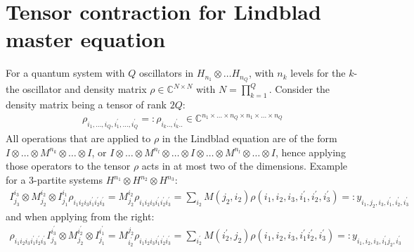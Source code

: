 \documentclass[letterpaper]{article}
\newcommand{\C}{\mathds{C}}
\begin{document}
\section{Tensor contraction for Lindblad master equation}
For a quantum system with $Q$ oscillators in $H_{n_1} \otimes \dots H_{n_Q}$, with $n_k$ levels for the $k$-the oscillator and density matrix $\rho \in \C^{N\times N}$ with $N=\prod_{k=1}^{Q}$. Consider the density matrix being a tensor of rank $2Q$: 
\begin{align}
    \rho_{i_1,\dots, i_Q, i_1^{\prime}, \dots, i_Q^{\prime}} =: \rho_{i_k .., i_k^\prime..}\in\C^{n_1\times \dots \times n_Q \times n_1 \times \dots \times n_Q}
\end{align}
All operations that are applied to $\rho$ in the Lindblad equation are of the form $I\otimes \dots \otimes M^{n_k} \otimes \dots \otimes I$, or $I\otimes \dots \otimes M^{n_l} \otimes \dots \otimes I \otimes \dots \otimes M^{n_l} \otimes \dots \otimes I$, hence applying those operators to the tensor $\rho$ acts in at most two of the dimensions. Example for a 3-partite systems $H^{n_1} \otimes H^{n_2} \otimes H^{n_3}$:
\begin{align}
    I^{i_3}_{j_3}\otimes M^{i_2}_{j_2} \otimes I^{i_1}_{j_1} \rho_{i_1i_2i_3i_1^{\prime}i_2^\prime i_3^\prime} = M^{i_2}_{j_2} \rho_{i_1i_2i_3i_1^{\prime}i_2^\prime i_3^\prime} = \sum_{i_2} M(j_2, i_2) \rho(i_1,i_2,i_3,i_1^{\prime},i_2^\prime, i_3^\prime)  =: y_{i_1,j_2,i_3,i_1^{\prime},i_2^\prime,i_3^\prime}
\end{align}
and when applying from the right:
\begin{align}
    \rho_{i_1i_2i_3i_1^{\prime}i_2^\prime i_3^\prime}I^{i_3^{\prime}}_{j_3}\otimes M^{i_2^\prime}_{j_2} \otimes I^{i_1^\prime}_{j_1}  = M^{j_2}_{i_2^\prime} \rho_{i_1i_2i_3i_1^{\prime}i_2^\prime i_3^\prime} = \sum_{i_2^\prime} M(i_2^{\prime}, j_2) \rho(i_1,i_2,i_3,i_1^{\prime}i_2^\prime, i_3^\prime)  =: y_{i_1,i_2,i_3,i_1^{\prime}j_2, i_3^\prime}
\end{align}
\end{document}
